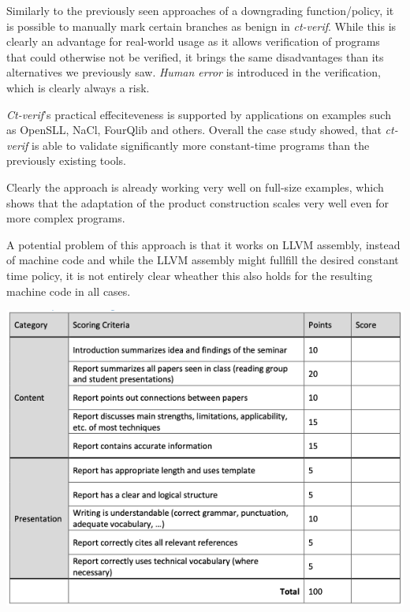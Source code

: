 \documentclass[a4paper,UKenglish]{lipics-v2018}
\begin{document}
Similarly to the previously seen approaches of a downgrading function/policy, it is possible to manually mark certain branches as benign in \textit{ct-verif}. While this is clearly an advantage for real-world usage as it allows verification of programs that could otherwise not be verified, it brings the same disadvantages than its alternatives we previously saw. \textit{Human error} is introduced in the verification, which is clearly always a risk.

\textit{Ct-verif}'s practical effeciteveness is supported by applications on examples such as OpenSLL, NaCl, FourQlib and others. Overall the case study showed, that \textit{ct-verif} is able to validate significantly more constant-time programs than the previously existing tools.
\cite{verifying_constant_time_implementations}

Clearly the approach is already working very well on full-size examples, which shows that the adaptation of the product construction scales very well even for more complex programs.
\cite{verifying_constant_time_implementations}

A potential problem of this approach is that it works on LLVM assembly, instead of machine code and while the LLVM assembly might fullfill the desired constant time policy, it is not entirely clear wheather this also holds for the resulting machine code in all cases.\cite{verifying_constant_time_implementations}




\newpage
\includegraphics[scale = 0.72]{pictures/grading_scheme}\\

\newpage

\end{document}
